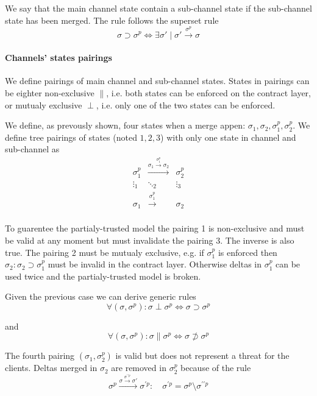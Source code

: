 \documentclass{llncs}
\begin{document}
We say that the main channel state contain a sub-channel state if the sub-channel state has been merged. The rule follows the superset rule
$$\sigma \supset \sigma^p \iff \exists \sigma' \mid \sigma' \xrightarrow{\sigma^p} \sigma$$

\paragraph{Channels' states pairings} We define pairings of main channel and sub-channel states. States in pairings can be eighter non-exclusive $\parallel$, i.e. both states can be enforced on the contract layer, or mutualy exclusive $\perp$, i.e. only one of the two states can be enforced.

We define, as prevously shown, four states when a merge appen: $\sigma_1, \sigma_2, \sigma^p_1, \sigma^p_2$. We define tree pairings of states (noted $1, 2, 3$) with only one state in channel and sub-channel as
\begin{equation*}
    \begin{matrix}
        \sigma^p_1 & \xrightarrow{\sigma_1 \xrightarrow{\sigma^p_1} \sigma_2} & \sigma^p_2 \\
        \vdots_1 & \ddots_2 & \vdots_3 \\
        \sigma_1 & \xrightarrow{\sigma^p_1} & \sigma_2 \\
    \end{matrix}
\end{equation*}

To guarentee the partialy-trusted model the pairing 1 is non-exclusive and must be valid at any moment but must invalidate the pairing 3. The inverse is also true. The pairing 2 must be mutualy exclusive, e.g. if $\sigma^p_1$ is enforced then $\sigma_2 : \sigma_2 \supset \sigma^p_1$ must be invalid in the contract layer. Otherwise deltas in $\sigma^p_1$ can be used twice and the partialy-trusted model is broken. 

Given the previous case we can derive generic rules
$$\forall (\sigma, \sigma^p) : \sigma \perp \sigma^p \iff \sigma \supset \sigma^p$$

and
$$\forall (\sigma, \sigma^p) : \sigma \parallel \sigma^p \iff \sigma \not \supset \sigma^p$$

The fourth pairing $(\sigma_1, \sigma^p_2)$ is valid but does not represent a threat for the clients. Deltas merged in $\sigma_2$ are removed in $\sigma^p_2$ because of the rule
$$\sigma^p \xrightarrow{\sigma \xrightarrow{\sigma^{\prime\prime p}} \sigma'} \sigma^{\prime p} : \quad \sigma^{\prime p} = \sigma^p \setminus \sigma^{\prime\prime p}$$
\end{document}
